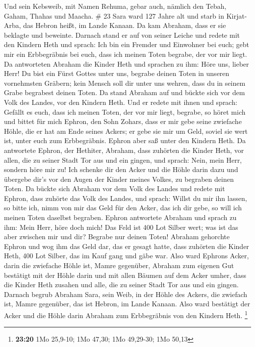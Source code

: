  Und sein Kebsweib, mit Namen Rehuma, gebar auch, nämlich
den Tebah, Gaham, Thahas und Maacha. \# 23  Sara ward 127
Jahre alt  und starb in Kirjat-Arba, das Hebron heißt, im
Lande Kanaan. Da kam Abraham, dass er sie beklagte und beweinte.
 Darnach stand er auf von seiner Leiche und redete mit den
Kindern Heth und sprach:  Ich bin ein Fremder und Einwohner
bei euch; gebt mir ein Erbbegräbnis bei euch, dass ich meinen Toten
begrabe, der vor mir liegt.  Da antworteten Abraham die
Kinder Heth und sprachen zu ihm:  Höre uns, lieber Herr! Du
bist ein Fürst Gottes unter uns, begrabe deinen Toten in unseren
vornehmsten Gräbern; kein Mensch soll dir unter uns wehren, dass du in
seinem Grabe begrabest deinen Toten.  Da stand Abraham auf
und bückte sich vor dem Volk des Landes, vor den Kindern Heth.
 Und er redete mit ihnen und sprach: Gefällt es euch, dass
ich meinen Toten, der vor mir liegt, begrabe, so höret mich und bittet
für mich Ephron, den Sohn Zohars,  dass er mir gebe seine
zwiefache Höhle, die er hat am Ende seines Ackers; er gebe sie mir um
Geld, soviel sie wert ist, unter euch zum Erbbegräbnis. 
Ephron aber saß unter den Kindern Heth. Da antwortete Ephron, der
Hethiter, Abraham, dass zuhörten die Kinder Heth, vor allen, die zu
seiner Stadt Tor aus und ein gingen, und sprach:  Nein,
mein Herr, sondern höre mir zu! Ich schenke dir den Acker und die Höhle
darin dazu und übergebe dir's vor den Augen der Kinder meines Volkes, zu
begraben deinen Toten.  Da bückte sich Abraham vor dem Volk
des Landes  und redete mit Ephron, dass zuhörte das Volk
des Landes, und sprach: Willst du mir ihn lassen, so bitte ich, nimm von
mir das Geld für den Acker, das ich dir gebe, so will ich meinen Toten
daselbst begraben.  Ephron antwortete Abraham und sprach zu
ihm:  Mein Herr, höre doch mich! Das Feld ist 400 Lot
Silber wert; was ist das aber zwischen mir und dir? Begrabe nur deinen
Toten!  Abraham gehorchte Ephron und wog ihm das Geld dar,
das er gesagt hatte, dass zuhörten die Kinder Heth, 400 Lot Silber, das
im Kauf gang und gäbe war.  Also ward Ephrons Acker, darin
die zwiefache Höhle ist, Mamre gegenüber, Abraham zum eigenen Gut
bestätigt mit der Höhle darin und mit allen Bäumen auf dem Acker umher,
 dass die Kinder Heth zusahen und alle, die zu seiner Stadt
Tor aus und ein gingen.  Darnach begrub Abraham Sara, sein
Weib, in der Höhle des Ackers, die zwiefach ist, Mamre gegenüber, das
ist Hebron, im Lande Kanaan.  Also ward bestätigt der Acker
und die Höhle darin Abraham zum Erbbegräbnis von den Kindern Heth.
\footnote{\textbf{23:20} 1Mo 25,9-10; 1Mo 47,30; 1Mo 49,29-30; 1Mo 50,13}


